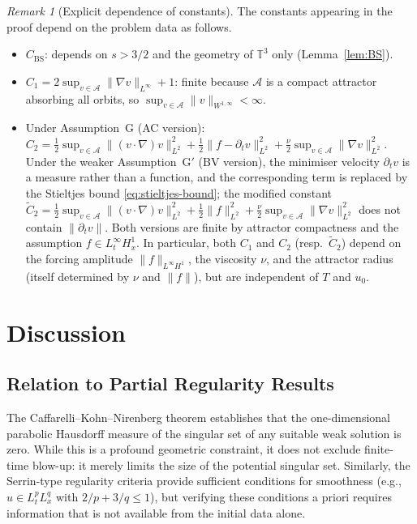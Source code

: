 \documentclass[12pt,a4paper]{article}
\theoremstyle{definition}
\theoremstyle{plain}
\theoremstyle{remark}
\newtheorem{remark}[definition]{Remark}
\begin{document}
\begin{remark}[Explicit dependence of constants]
\label{rem:constants}
The constants appearing in the proof depend on the problem data as follows.
\begin{itemize}
    \item $C_{\mathrm{BS}}$: depends on $s > 3/2$ and the geometry of
          $\mathbb{T}^3$ only (Lemma~\ref{lem:BS}).
    \item $C_1 = 2\sup_{v\in\mathcal{A}}\|\nabla v\|_{L^\infty} + 1$: finite
          because $\mathcal{A}$ is a compact attractor absorbing all orbits, so
          $\sup_{v\in\mathcal{A}}\|v\|_{W^{1,\infty}} < \infty$.
    \item Under Assumption~G (AC version):
          $C_2 = \tfrac12\sup_{v\in\mathcal{A}}\|(v\cdot\nabla)v\|_{L^2}^2
          + \tfrac12\|f - \partial_t v\|_{L^2}^2
          + \tfrac{\nu}{2}\sup_{v\in\mathcal{A}}\|\nabla v\|_{L^2}^2$.
          Under the weaker Assumption~G$'$ (BV version), the minimiser
          velocity $\partial_t v$ is a measure rather than a function, and the
          corresponding term is replaced by the Stieltjes bound
          \eqref{eq:stieltjes-bound}; the modified constant
          $\widetilde{C}_2 = \tfrac12\sup_{v\in\mathcal{A}}\|(v\cdot\nabla)v\|_{L^2}^2
          + \tfrac12\|f\|_{L^2}^2 +
          \tfrac{\nu}{2}\sup_{v\in\mathcal{A}}\|\nabla v\|_{L^2}^2$
          does not contain $\|\partial_t v\|$.
          Both versions are finite by attractor compactness and the assumption
          $f \in L^\infty_t H^1_x$.  In particular, both $C_1$ and $C_2$
          (resp.\ $\widetilde{C}_2$)
          depend on the forcing amplitude $\|f\|_{L^\infty H^1}$, the
          viscosity $\nu$, and the attractor radius (itself determined by
          $\nu$ and $\|f\|$), but are independent of $T$ and $u_0$.
\end{itemize}
\end{remark}

\section{Discussion}

\subsection{Relation to Partial Regularity Results}

The Caffarelli--Kohn--Nirenberg theorem \cite{CaffarelliKohnNirenberg1982} establishes that the one-dimensional parabolic Hausdorff measure of the singular set of any suitable weak solution is zero. While this is a profound geometric constraint, it does not exclude finite-time blow-up: it merely limits the size of the potential singular set. Similarly, the Serrin-type regularity criteria \cite{Leray1934,ConstantinFoias1988} provide sufficient conditions for smoothness (e.g., $u \in L^p_t L^q_x$ with $2/p + 3/q \le 1$), but verifying these conditions a priori requires information that is not available from the initial data alone.
\end{document}
